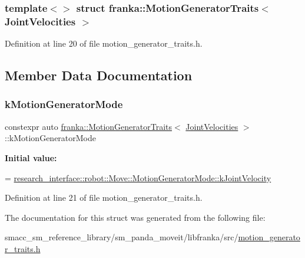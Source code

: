 \subsubsection*{template$<$$>$\newline
struct franka\+::\+Motion\+Generator\+Traits$<$ Joint\+Velocities $>$}



Definition at line 20 of file motion\+\_\+generator\+\_\+traits.\+h.



\subsection{Member Data Documentation}
\mbox{\label{structfranka_1_1MotionGeneratorTraits_3_01JointVelocities_01_4_ada18869e23e04d6655a93c811b99679f}} 
\subsubsection{\texorpdfstring{k\+Motion\+Generator\+Mode}{kMotionGeneratorMode}}
{\footnotesize\ttfamily constexpr auto \hyperlink{structfranka_1_1MotionGeneratorTraits}{franka\+::\+Motion\+Generator\+Traits}$<$ \hyperlink{classfranka_1_1JointVelocities}{Joint\+Velocities} $>$\+::k\+Motion\+Generator\+Mode\hspace{0.3cm}{\ttfamily [static]}}

{\bfseries Initial value\+:}
\begin{DoxyCode}
=
      \hyperlink{structresearch__interface_1_1robot_1_1Move_a334b8380507154e8042b57fbd3287c0fa729c7783e4ea7890b50022b1194e89d6}{research\_interface::robot::Move::MotionGeneratorMode::kJointVelocity}
\end{DoxyCode}


Definition at line 21 of file motion\+\_\+generator\+\_\+traits.\+h.



The documentation for this struct was generated from the following file\+:\begin{DoxyCompactItemize}
\item 
smacc\+\_\+sm\+\_\+reference\+\_\+library/sm\+\_\+panda\+\_\+moveit/libfranka/src/\hyperlink{motion__generator__traits_8h}{motion\+\_\+generator\+\_\+traits.\+h}\end{DoxyCompactItemize}
